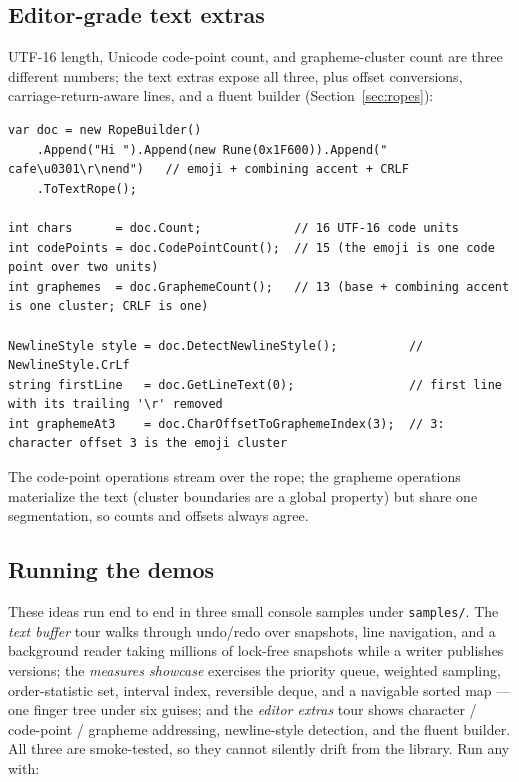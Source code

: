 \documentclass[11pt]{article}
\begin{document}
\subsection{Editor-grade text extras}

UTF-16 length, Unicode code-point count, and grapheme-cluster count are three different numbers; the text
extras expose all three, plus offset conversions, carriage-return-aware lines, and a fluent builder
(Section~\ref{sec:ropes}):

\begin{lstlisting}
var doc = new RopeBuilder()
    .Append("Hi ").Append(new Rune(0x1F600)).Append(" cafe\u0301\r\nend")   // emoji + combining accent + CRLF
    .ToTextRope();

int chars      = doc.Count;             // 16 UTF-16 code units
int codePoints = doc.CodePointCount();  // 15 (the emoji is one code point over two units)
int graphemes  = doc.GraphemeCount();   // 13 (base + combining accent is one cluster; CRLF is one)

NewlineStyle style = doc.DetectNewlineStyle();          // NewlineStyle.CrLf
string firstLine   = doc.GetLineText(0);                // first line with its trailing '\r' removed
int graphemeAt3    = doc.CharOffsetToGraphemeIndex(3);  // 3: character offset 3 is the emoji cluster
\end{lstlisting}

The code-point operations stream over the rope; the grapheme operations materialize the text (cluster
boundaries are a global property) but share one segmentation, so counts and offsets always agree.

\subsection{Running the demos}

These ideas run end to end in three small console samples under \texttt{samples/}. The \emph{text buffer}
tour walks through undo/redo over snapshots, line navigation, and a background reader taking millions of
lock-free snapshots while a writer publishes versions; the \emph{measures showcase} exercises the priority
queue, weighted sampling, order-statistic set, interval index, reversible deque, and a navigable sorted map
--- one finger tree under six guises; and the \emph{editor extras} tour shows character / code-point /
grapheme addressing, newline-style detection, and the fluent builder. All three are smoke-tested, so they
cannot silently drift from the library. Run any with:
\end{document}
